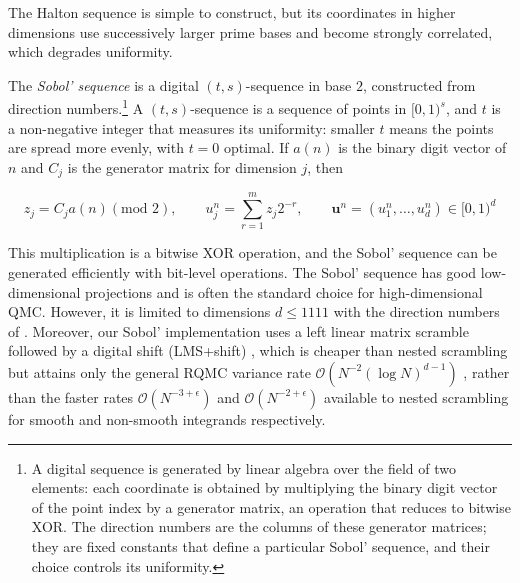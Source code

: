 The Halton sequence is simple to construct, but its coordinates in higher dimensions use successively larger prime bases and become strongly correlated, which degrades uniformity.





The \emph{Sobol' sequence} \citep{sobol1967distribution} is a digital $(t,s)$-sequence in base $2$, constructed from direction numbers.\footnote{A digital sequence is generated by linear algebra over the field of two elements: each coordinate is obtained by multiplying the binary digit vector of the point index by a generator matrix, an operation that reduces to bitwise XOR. The direction numbers are the columns of these generator matrices; they are fixed constants that define a particular Sobol' sequence, and their choice controls its uniformity.} A $(t,s)$-sequence is a sequence of points in $[0,1)^s$, and $t$ is a non-negative integer that measures its uniformity: smaller $t$ means the points are spread more evenly, with $t=0$ optimal. If $a(n)$ is the binary digit vector of $n$ and $C_j$ is the generator matrix for dimension $j$, then

\begin{equation}
    z_j = C_j a(n) (\text{mod } 2), \qquad u_j^n = \sum_{r = 1}^{m} z_j 2^{-r}, \qquad \mathbf{u}^n = (u_1^n, \ldots, u_d^n) \in [0,1)^d
\end{equation}

This multiplication is a bitwise XOR operation, and the Sobol' sequence can be generated efficiently with bit-level operations. The Sobol' sequence has good low-dimensional projections and is often the standard choice for high-dimensional QMC. However, it is limited to dimensions $d \leq 1111$ with the direction numbers of \citet{joekuo2008sobol}. Moreover, our Sobol' implementation uses a left linear matrix scramble followed by a digital shift (LMS+shift) \citep{matousek1998l2discrepancy}, which is cheaper than nested scrambling but attains only the general RQMC variance rate $\mathcal{O}(N^{-2} (\log N)^{d-1})$ \citep{owen1997scrambling}, rather than the faster rates $\mathcal{O}(N^{-3+\epsilon})$ and $\mathcal{O}(N^{-2+\epsilon})$ available to nested scrambling for smooth and non-smooth integrands respectively. 

